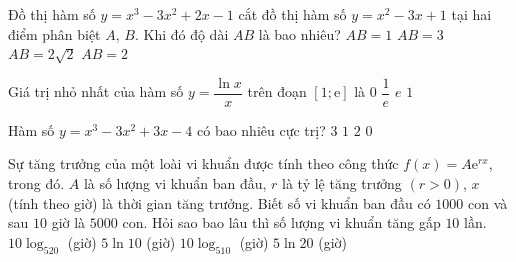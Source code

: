 \begin{ex}%
	Đồ thị hàm số $y=x^3-3x^2+2x-1$ cắt đồ thị hàm số $y=x^2-3x+1$ tại hai điểm phân biệt $A$, $B$. Khi đó độ dài $AB$ là bao nhiêu?
	\choice
	{\True $AB=1$}
	{$AB=3$}
	{$AB=2\sqrt{2}$}
	{$AB=2$}
\end{ex}
\begin{ex}%
	Giá trị nhỏ nhất của hàm số $y=\dfrac{\ln x}{x}$ trên đoạn $[1;\mathrm{e}]$ là
	\choice
	{\True $0$}
	{$\dfrac{1}{e}$}
	{$e$}
	{$1$}
\end{ex}
\begin{ex}%
	Hàm số $y=x^3-3x^2+3x-4$ có bao nhiêu cực trị?
	\choice
	{$3$}
	{$1$}
	{$2$}
	{\True $0$}
\end{ex}
\begin{ex}%
	Sự tăng trưởng của một loài vi khuẩn được tính theo công thức $f(x)=A\mathrm{e}^{rx}$, trong đó. $A$ là số lượng vi khuẩn ban đầu, $r$ là tỷ lệ tăng trưởng $\left(r>0\right)$, $x$ (tính theo giờ) là thời gian tăng trưởng. Biết số vi khuẩn ban đầu có $1000$ con và sau $10$ giờ là $5000$ con. Hỏi sao bao lâu thì số lượng vi khuẩn tăng gấp $10$ lần.
	\choice
	{$10\log _520$ (giờ)}
	{$5\ln 10$ (giờ)}
	{\True $10\log _510$ (giờ)}
	{$5\ln 20$ (giờ)}
\end{ex}
